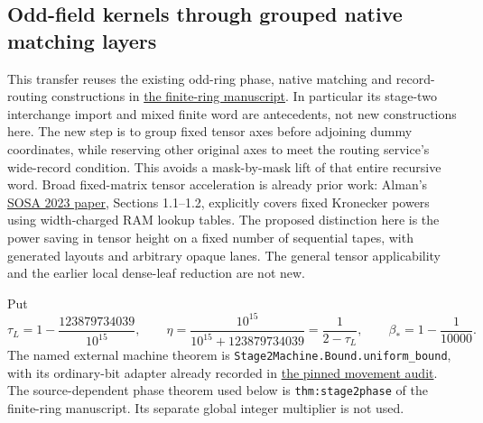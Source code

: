 \subsection{Odd-field kernels through grouped native matching layers}
\label{sec:oddgroupedtransfer}
This transfer reuses the existing odd-ring phase, native matching and
record-routing constructions in
\href{native_odd_source_snapshot.tex.txt}{the finite-ring manuscript}.
In particular its stage-two interchange import and mixed finite word
are antecedents, not new constructions here. The new step is to group
fixed tensor axes before adjoining dummy coordinates, while reserving
other original axes to meet the routing service's wide-record condition.
This avoids a mask-by-mask lift of that entire recursive word.
Broad fixed-matrix tensor acceleration is already prior work: Alman's
\href{https://arxiv.org/html/2211.04643v1}{SOSA 2023 paper},
Sections 1.1--1.2, explicitly covers fixed Kronecker powers using
width-charged RAM lookup tables. The proposed distinction here is the
power saving in tensor height on a fixed number of sequential tapes,
with generated layouts and arbitrary opaque lanes. The general tensor
applicability and the earlier local dense-leaf reduction are not new.

Put
\[
 \tau_L=1-\frac{123879734039}{10^{15}},\qquad
 \eta=\frac{10^{15}}{10^{15}+123879734039}=\frac1{2-\tau_L},
 \qquad \beta_*=1-\frac1{10000}.
\]
The named external machine theorem is
\texttt{Stage2Machine.Bound.uniform\_bound}, with its ordinary-bit
adapter already recorded in
\href{PINNED_STAGE2_BINARY_MOVEMENT_BRIDGE_20261030.txt}{the pinned movement audit}.
The source-dependent phase theorem used below is
\texttt{thm:stage2phase} of the finite-ring manuscript. Its separate
global integer multiplier is not used.


